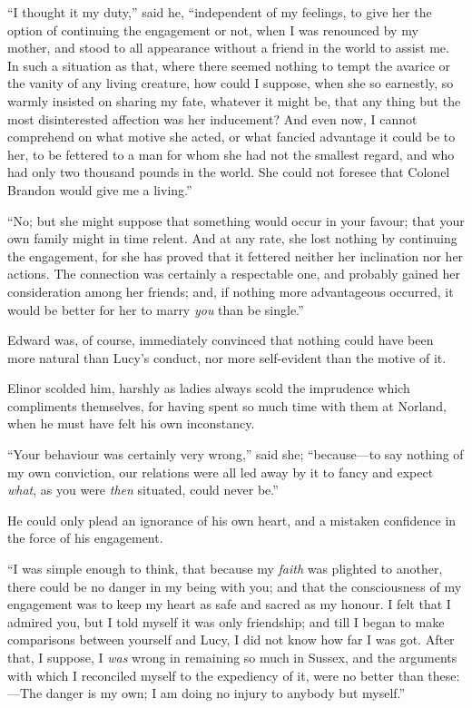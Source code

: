 ``I thought it my duty,'' said he, ``independent of my feelings,
to give her the option of continuing the engagement or not,
when I was renounced by my mother, and stood to all
appearance without a friend in the world to assist me.
In such a situation as that, where there seemed nothing
to tempt the avarice or the vanity of any living creature,
how could I suppose, when she so earnestly, so warmly insisted
on sharing my fate, whatever it might be, that any thing
but the most disinterested affection was her inducement?
And even now, I cannot comprehend on what motive she acted,
or what fancied advantage it could be to her, to be
fettered to a man for whom she had not the smallest regard,
and who had only two thousand pounds in the world.
She could not foresee that Colonel Brandon would give me a
living.''

``No; but she might suppose that something would occur
in your favour; that your own family might in time relent.
And at any rate, she lost nothing by continuing the engagement,
for she has proved that it fettered neither her inclination
nor her actions.  The connection was certainly a
respectable one, and probably gained her consideration among
her friends; and, if nothing more advantageous occurred,
it would be better for her to marry \emph{you} than be single.''

Edward was, of course, immediately convinced that
nothing could have been more natural than Lucy's conduct,
nor more self-evident than the motive of it.

Elinor scolded him, harshly as ladies always scold
the imprudence which compliments themselves, for having
spent so much time with them at Norland, when he must
have felt his own inconstancy.

``Your behaviour was certainly very wrong,'' said she;
``because---to say nothing of my own conviction, our relations
were all led away by it to fancy and expect \emph{what}, as you
were \emph{then} situated, could never be.''

He could only plead an ignorance of his own heart,
and a mistaken confidence in the force of his engagement.

``I was simple enough to think, that because my \emph{faith}
was plighted to another, there could be no danger in my being
with you; and that the consciousness of my engagement was
to keep my heart as safe and sacred as my honour.  I felt
that I admired you, but I told myself it was only friendship;
and till I began to make comparisons between yourself
and Lucy, I did not know how far I was got.  After that,
I suppose, I \emph{was} wrong in remaining so much in Sussex,
and the arguments with which I reconciled myself to the
expediency of it, were no better than these:---The danger
is my own; I am doing no injury to anybody but myself.''

